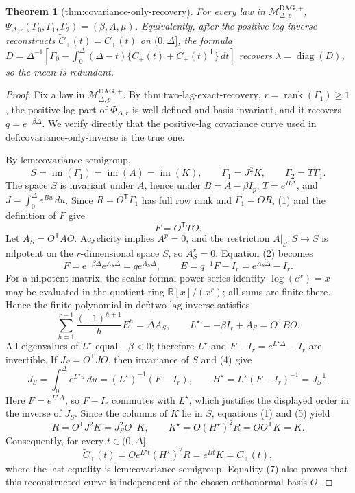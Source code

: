 \documentclass{article}
\newtheorem{theorem}{Theorem}
\begin{document}
\begin{theorem}[thm:covariance-only-recovery]\label{thm:covariance-only-recovery}
For every law in \(\mathcal M_{\Delta,p}^{\mathrm{DAG},+}\), \(\Psi_{\Delta,r}(\Gamma_0,\Gamma_1,\Gamma_2)=(\beta,A,\mu)\). Equivalently, after the positive-lag inverse reconstructs \(\widetilde C_{+}(t)=C_{+}(t)\) on \((0,\Delta]\), the formula \(D=\Delta^{-1}[\Gamma_0-\int_0^\Delta(\Delta-t)\{C_{+}(t)+C_{+}(t)^{\mathsf T}\}\,dt]\) recovers \(\lambda=\operatorname{diag}(D)\), so the mean is redundant.
\end{theorem}
\begin{proof}
Fix a law in \(\mathcal M_{\Delta,p}^{\mathrm{DAG},+}\).  By \(\text{thm:two-lag-exact-recovery}\), \(r=\operatorname{rank}(\Gamma_1)\geq1\), the positive-lag part of \(\Phi_{\Delta,r}\) is well defined and basis invariant, and it recovers \(q=e^{-\beta\Delta}\).  We verify directly that the positive-lag covariance curve used in \(\text{def:covariance-only-inverse}\) is the true one.

By \(\text{lem:covariance-semigroup}\),
\[
 S=\operatorname{im}(\Gamma_1)=\operatorname{im}(A)=\operatorname{im}(K),
 \qquad \Gamma_1=J^2K,
 \qquad \Gamma_2=T\Gamma_1.
\tag{1}
\]
The space \(S\) is invariant under \(A\), hence under \(B=A-\beta I_p\), \(T=e^{B\Delta}\), and \(J=\int_0^\Delta e^{Bu}\,du\).  Since \(R=O^{\mathsf T}\Gamma_1\) has full row rank and \(\Gamma_1=OR\), (1) and the definition of \(F\) give
\[
 F=O^{\mathsf T}TO.
\tag{2}
\]
Let \(A_S=O^{\mathsf T}AO\).  Acyclicity implies \(A^p=0\), and the restriction \(A|_S:S\to S\) is nilpotent on the \(r\)-dimensional space \(S\), so \(A_S^r=0\).  Equation (2) becomes
\[
 F=e^{-\beta\Delta}e^{A_S\Delta}=q e^{A_S\Delta},
 \qquad E=q^{-1}F-I_r=e^{A_S\Delta}-I_r.
\tag{3}
\]
For a nilpotent matrix, the scalar formal-power-series identity \(\log(e^x)=x\) may be evaluated in the quotient ring \(\mathbb R[x]/(x^r)\); all sums are finite there.  Hence the finite polynomial in \(\text{def:two-lag-inverse}\) satisfies
\[
 \sum_{h=1}^{r-1}\frac{(-1)^{h+1}}{h}E^h=\Delta A_S,
 \qquad L^\star=-\beta I_r+A_S=O^{\mathsf T}BO.
\tag{4}
\]
All eigenvalues of \(L^\star\) equal \(-\beta<0\); therefore \(L^\star\) and \(F-I_r=e^{L^\star\Delta}-I_r\) are invertible.  If \(J_S=O^{\mathsf T}JO\), then invariance of \(S\) and (4) give
\[
 J_S=\int_0^\Delta e^{L^\star u}\,du
 =(L^\star)^{-1}(F-I_r),
 \qquad H^\star=L^\star(F-I_r)^{-1}=J_S^{-1}.
\tag{5}
\]
Here \(F=e^{L^\star\Delta}\), so \(F-I_r\) commutes with \(L^\star\), which justifies the displayed order in the inverse of \(J_S\).
Since the columns of \(K\) lie in \(S\), equations (1) and (5) yield
\[
 R=O^{\mathsf T}J^2K=J_S^2O^{\mathsf T}K,
 \qquad K^\star=O(H^\star)^2R=OO^{\mathsf T}K=K.
\tag{6}
\]
Consequently, for every \(t\in(0,\Delta]\),
\[
 \widetilde C_{+}(t)
 =Oe^{L^\star t}(H^\star)^2R
 =e^{Bt}K
 =C_{+}(t),
\tag{7}
\]
where the last equality is \(\text{lem:covariance-semigroup}\).  Equality (7) also proves that this reconstructed curve is independent of the chosen orthonormal basis \(O\).


\end{proof}
\end{document}
